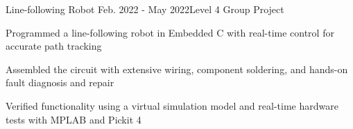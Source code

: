 \begin{rSubsection}{Line-following Robot} {Feb. 2022 - May 2022}{Level 4 Group Project}{}
\item Programmed a line-following robot in Embedded C with real-time control for accurate path tracking
\item Assembled the circuit with extensive wiring, component soldering, and hands-on fault diagnosis and repair
\item Verified functionality using a virtual simulation model and real-time hardware tests with MPLAB and Pickit 4
\end{rSubsection}